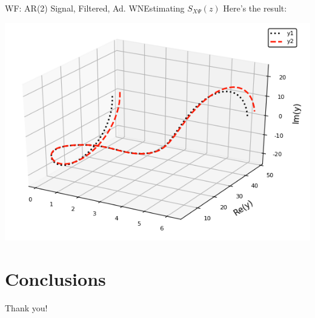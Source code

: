 \documentclass{beamer}  %
\begin{document}
\begin{frame}{WF: AR(2) Signal, Filtered, Ad. WN}{Estimating $S_{X\Psi}(z)$}
	Here's the result:
	
	
	\includegraphics[scale=.6]{fig/spectpred.PNG}
	
\end{frame}


\section{Conclusions}



\begin{frame}
Thank you!
\end{frame}
\end{document}
